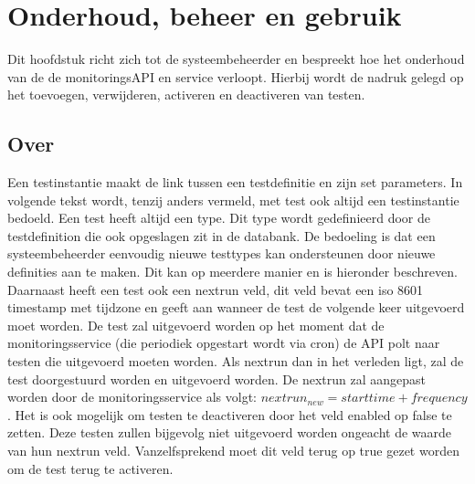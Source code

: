 \chapter{Onderhoud, beheer en gebruik}
\label{ONDERHOUD}
{\samenvatting Dit hoofdstuk richt zich tot de systeembeheerder en bespreekt hoe het onderhoud van de de monitoringsAPI en service verloopt. Hierbij wordt de nadruk gelegd op het toevoegen, verwijderen, activeren en deactiveren van testen.}
\npar
\section{Over}
\npar
Een testinstantie maakt de link tussen een testdefinitie en zijn set parameters. In volgende tekst wordt, tenzij anders vermeld, met test ook altijd een testinstantie bedoeld. Een test heeft altijd een type. Dit type wordt gedefinieerd door de testdefinition die ook opgeslagen zit in de databank. De bedoeling is dat een systeembeheerder eenvoudig nieuwe testtypes kan ondersteunen door nieuwe definities aan te maken. Dit kan op meerdere manier en is hieronder beschreven.
\npar
Daarnaast heeft een test ook een nextrun veld, dit veld bevat een iso 8601 timestamp met tijdzone en geeft aan wanneer de test de volgende keer uitgevoerd moet worden. De test zal uitgevoerd worden op het moment dat de monitoringsservice (die periodiek opgestart wordt via cron) de API polt naar testen die uitgevoerd moeten worden. Als nextrun dan in het verleden ligt, zal de test doorgestuurd worden en uitgevoerd worden. De nextrun zal aangepast worden door de monitoringsservice als volgt: $nextrun_{new} = starttime + frequency$.
\npar
Het is ook mogelijk om testen te deactiveren door het veld enabled op false te zetten. Deze testen zullen bijgevolg niet uitgevoerd worden ongeacht de waarde van hun nextrun veld. Vanzelfsprekend moet dit veld terug op true gezet worden om de test terug te activeren.

